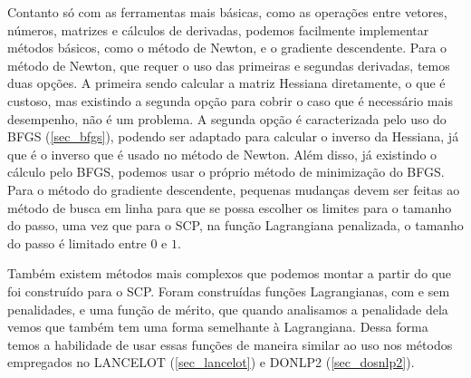 Contanto só com as ferramentas mais básicas, como as operações entre vetores, números,
matrizes e cálculos de derivadas, podemos facilmente implementar métodos básicos, como
o método de Newton, e o gradiente descendente. Para o método de Newton, que requer o
uso das primeiras e segundas derivadas, temos duas opções. A primeira sendo calcular
a matriz Hessiana diretamente, o que é custoso, mas existindo a segunda opção para
cobrir o caso que é necessário mais desempenho, não é um problema. A segunda opção
é caracterizada pelo uso do BFGS (\ref{sec_bfgs}), podendo ser adaptado para calcular
o inverso da Hessiana, já que é o inverso que é usado no método de Newton. Além disso,
já existindo o cálculo pelo BFGS, podemos usar o próprio método de minimização do BFGS.
Para o método do gradiente descendente, pequenas mudanças devem ser feitas ao método de
busca em linha para que se possa escolher os limites para o tamanho do passo, uma
vez que para o SCP, na função Lagrangiana penalizada, o tamanho do passo é limitado
entre \(0\) e \(1\).

Também existem métodos mais complexos que podemos montar a partir do que foi construído
para o SCP. Foram construídas funções Lagrangianas, com e sem penalidades, e uma função
de mérito, que quando analisamos a penalidade dela vemos que também tem uma forma semelhante
à Lagrangiana. Dessa forma temos a habilidade de usar essas funções de maneira similar ao uso
nos métodos empregados no LANCELOT (\ref{sec_lancelot}) e DONLP2 (\ref{sec_dosnlp2}).